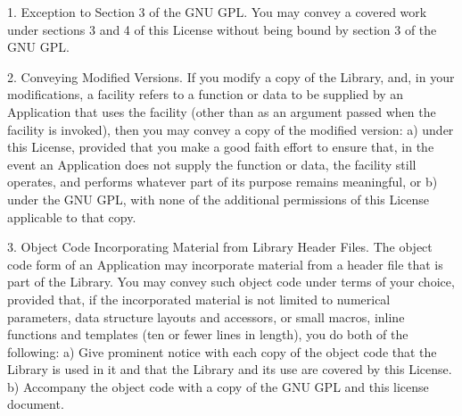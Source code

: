 \documentclass {scrbook}
\begin{document}
\begin{tiny}
1. Exception to Section 3 of the GNU GPL. You may convey a covered work under sections 3 and 4 of this License without being bound by section 3 of the GNU GPL.

2. Conveying Modified Versions. If you modify a copy of the Library, and, in your modifications, a facility refers to a function or data to be supplied by an Application that uses the facility (other than as an argument passed when the facility is invoked), then you may convey a copy of the modified version: a) under this License, provided that you make a good faith effort to ensure that, in the event an Application does not supply the function or data, the facility still operates, and performs whatever part of its purpose remains meaningful, or b) under the GNU GPL, with none of the additional permissions of this License applicable to that copy.

3. Object Code Incorporating Material from Library Header Files. The object code form of an Application may incorporate material from a header file that is part of the Library. You may convey such object code under terms of your choice, provided that, if the incorporated material is not limited to numerical parameters, data structure layouts and accessors, or small macros, inline functions and templates (ten or fewer lines in length), you do both of the following: a) Give prominent notice with each copy of the object code that the Library is used in it and that the Library and its use are covered by this License. b) Accompany the object code with a copy of the GNU GPL and this license document.


\end{tiny}
\end{document}
